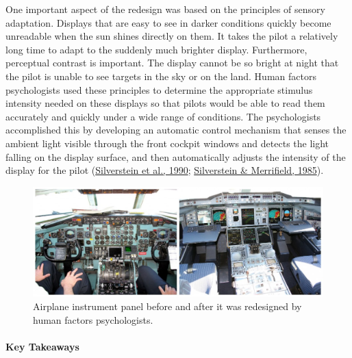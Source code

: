 \documentclass[
]{krantz}
\begin{document}
One important aspect of the redesign was based on the principles of sensory adaptation. Displays that are easy to see in darker conditions quickly become unreadable when the sun shines directly on them. It takes the pilot a relatively long time to adapt to the suddenly much brighter display. Furthermore, perceptual contrast is important. The display cannot be so bright at night that the pilot is unable to see targets in the sky or on the land. Human factors psychologists used these principles to determine the appropriate stimulus intensity needed on these displays so that pilots would be able to read them accurately and quickly under a wide range of conditions. The psychologists accomplished this by developing an automatic control mechanism that senses the ambient light visible through the front cockpit windows and detects the light falling on the display surface, and then automatically adjusts the intensity of the display for the pilot (\protect\hyperlink{ref-Silverstein1990}{Silverstein et al., 1990}; \protect\hyperlink{ref-Silverstein1985}{Silverstein \& Merrifield, 1985}).

\begin{figure}

{\centering \includegraphics[width=0.9\linewidth]{images/ch2/fig8} 

}

\caption{Airplane instrument panel before and after it was redesigned by human factors psychologists.}\label{fig:humanfactors}
\end{figure}

\hypertarget{key-takeaways-1}{%
\paragraph*{Key Takeaways}\label{key-takeaways-1}}
\end{document}
